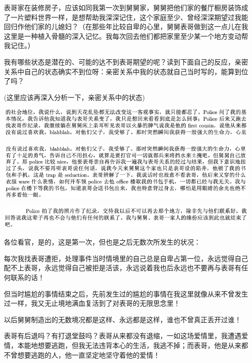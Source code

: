 \documentclass[9pt, b5paper]{article}
\begin{document}
表哥家在装修房子，应该如同我第一次到舅舅家，舅舅把他们家的餐厅橱房装饰成了一片塑料世界一样，是想帮助我深深记住，这个家庭至少、曾经深深期望过我能回归作他们家的儿媳妇？（在那些年比较自卑的心里，舅舅表哥做到这一点儿在我这里是一种植入骨髓的深入记忆。我每次回去他们都把家里至少某一个地方变动帮我记住。）

我有哪些状态是潜在的、可能的达不到表哥期望的呢？读到下面自己的反应，亲密关系中自己的状态确实不到位呀：亲密关系中我的状态就自己当时写的，能算到位了吗？

(这里应该再深入分析一下，亲密关系中的状态)

\begin{center}
\includegraphics[width=.9\linewidth]{./pic/p1p68-4.png}
\end{center}

\begin{center}
\includegraphics[width=.9\linewidth]{./pic/p1p68-5.png}
\end{center}

\begin{center}
\includegraphics[width=.9\linewidth]{./pic/p1p68-6.png}
\end{center}

各位看官，是的，这是第一次，但也是之后无数次所发生的状况：

每次我找表哥遭拒，处理事件当时情境里的自己总是自卑占第一位，永远觉得自己配不上表哥，永远觉得自己被拒是活该，永远说着我也后永远也不要再与表哥有任何联系的话！

但当时尴尬的事情结束之后，先前发生过的尴尬的事情在我这里就像从来不曾发生过一样，我又无止境地满血复活到了对表哥的无限思念里！

以后舅舅制造出的无数境况都是这样、永远都是这样，谁也不曾真正丢开过谁！

表哥有后退吗？有打退堂鼓吗？表哥从来都没有退缩，一如这场爱情里，我遭遇爱情，本能地想要逃跑，但我无法违背本心的生活，我逃不掉；而表哥，他是从来都不曾想要逃跑的人，他一直坚定地坚守着他的爱情！
\end{document}
